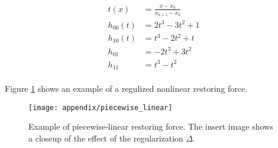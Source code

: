 \begin{equation}
  \label{eq:fnl_piecewise_coeff}
  \begin{aligned}
    t(x) &= \frac{x - x_k}{x_{k+1} - x_k}\\
    h_{00}(t) &=  2t^3 - 3t^2 + 1 \\
    h_{10}(t) &= t^3 - 2t^2 + t \\
    h_{01} &= -2t^3 + 3t^2 \\
    h_{11} &= t^3 - t^2 \\
  \end{aligned}
\end{equation}

Figure \ref{fig:fnl_piecewise} shows an example of a regulized nonlinear
restoring force.

\begin{figure}[!ht]
  \centering
  \texttt{[image: appendix/piecewise\_linear]}
  \caption{Example of piecewise-linear restoring force. The insert image shows
    a closeup of the effect of the regularization $\Delta$.}
  \label{fig:fnl_piecewise}
\end{figure}



\FloatBarrier



